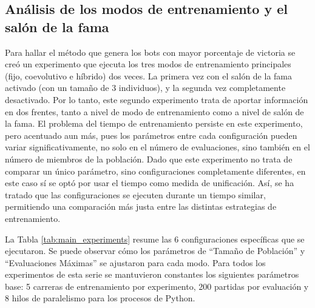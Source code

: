 \subsection{Análisis de los modos de entrenamiento y el salón de la fama} \label{sec:experimentos_modos_entrenamiento}

Para hallar el método que genera los bots con mayor porcentaje de victoria se creó un experimento que ejecuta los tres modos de entrenamiento principales (fijo, coevolutivo e híbrido) dos veces. La primera vez con el salón de la fama activado (con un tamaño de 3 individuos), y la segunda vez completamente desactivado. Por lo tanto, este segundo experimento trata de aportar información en dos frentes, tanto a nivel de modo de entrenamiento como a nivel de salón de la fama. El problema del tiempo de entrenamiento persiste en este experimento, pero acentuado aun más, pues los parámetros entre cada configuración pueden variar significativamente, no solo en el número de evaluaciones, sino también en el número de miembros de la población. Dado que este experimento no trata de comparar un único parámetro, sino configuraciones completamente diferentes, en este caso sí se optó por usar el tiempo como medida de unificación. Así, se ha tratado que las configuraciones se ejecuten durante un tiempo similar, permitiendo una comparación más justa entre las distintas estrategias de entrenamiento.

La Tabla \ref{tab:main_experiments} resume las 6 configuraciones específicas que se ejecutaron. Se puede observar cómo los parámetros de ``Tamaño de Población'' y ``Evaluaciones Máximas'' se ajustaron para cada modo. Para todos los experimentos de esta serie se mantuvieron constantes los siguientes parámetros base: 5 carreras de entrenamiento por experimento, 200 partidas por evaluación y 8 hilos de paralelismo para los procesos de Python.



